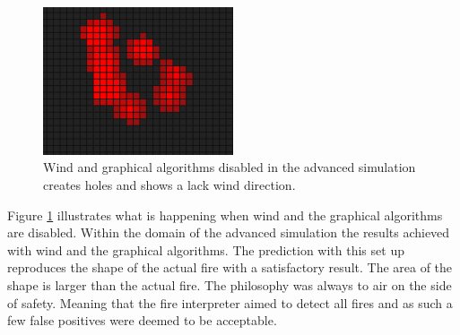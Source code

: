 \begin{figure}[here]
  \centering
      \includegraphics[width=0.5\textwidth]{discussion/graphics/advanced-without-wind-and-bresenham.png}
  \caption{Wind and graphical algorithms disabled in the advanced simulation creates holes and shows a lack wind direction.}
  \label{fig:advanced-without-wind-and-bresenham}
\end{figure}

Figure \ref{fig:advanced-without-wind-and-bresenham} illustrates what is happening when wind and the graphical algorithms are disabled. Within the domain of the advanced simulation the results achieved with wind and the graphical algorithms. The prediction with this set up reproduces the shape of the actual fire with a satisfactory result. The area of the shape is larger than the actual fire. The philosophy was always to air on the side of safety. Meaning that the fire interpreter aimed to detect all fires and as such a few false positives were deemed to be acceptable.